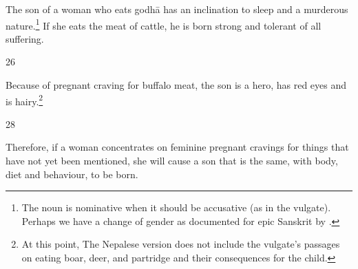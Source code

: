 \begin{translation}
The son of a woman who eats \gls{godhā} has an inclination to sleep
and a murderous nature.\footnote{The noun  is nominative
    when it should be accusative (as in the vulgate).  Perhaps we have a
    change of gender as documented for epic Sanskrit by
    \cite[62]{ober-2003}.}  If she eats the meat of cattle, he is born
    strong and tolerant of all suffering. 
    
\item [26] 
    
Because of pregnant craving for buffalo meat, the son is a hero, has red eyes and is 
hairy.\footnote{At this point, The Nepalese version does not include the vulgate's 
passages on eating boar, deer, and partridge and their consequences for the child.}

\item[28]

Therefore, if a woman concentrates on feminine  pregnant cravings for
things that have not yet been mentioned, she will cause a son that is
the same, with body, diet and behaviour, to be born.

\bigskip



\end{translation}
